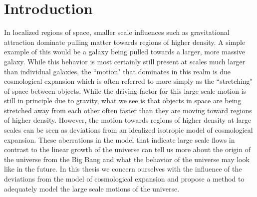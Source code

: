 \chapter{Introduction}

In localized regions of space, smaller scale influences such as gravitational attraction dominate pulling matter towards regions of higher density. A simple example of this would be a galaxy  being pulled towards a larger, more massive galaxy. While this behavior is most certainly still present at scales much larger than individual galaxies, the ``motion" that dominates in this realm is due cosmological expansion which is often referred to more simply as the ``stretching" of space between objects. While the driving factor for this large scale motion is still in principle due to gravity, what we see is that objects in space are being stretched away from each other often faster than they are moving toward regions of higher density. However, the motion towards regions of higher density at large scales can be seen as deviations from an idealized isotropic model of cosmological expansion.  These aberrations in the model that indicate large scale flows in contrast to the linear growth of the universe can tell us more about the origin of the universe from the Big Bang and what the behavior of the universe may look like in the future. In this thesis we concern ourselves with the influence of the deviations from the model of cosmological expansion and propose a method to adequately model the large scale motions of the universe.
